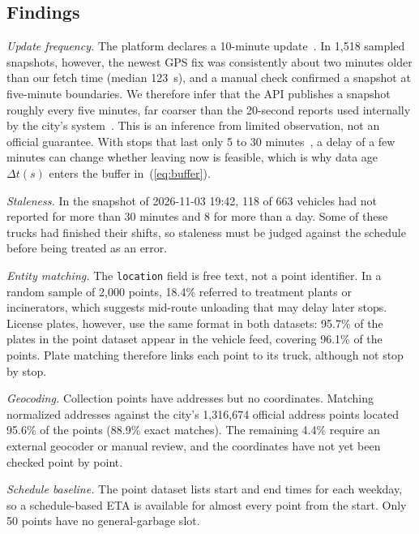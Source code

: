 \subsection{Findings}
\emph{Update frequency.} The platform declares a 10-minute
update~\cite{dataset83558}. In 1{,}518 sampled snapshots, however, the
newest GPS fix was consistently about two minutes older than our fetch
time (median 123~s), and a manual check confirmed a snapshot at
five-minute boundaries. We therefore infer that the API publishes a
snapshot roughly every five minutes, far coarser than the 20-second
reports used internally by the city's system~\cite{tcepb2022report}. This
is an inference from limited observation, not an official guarantee.
With stops that last only 5 to 30 minutes~\cite{tcepb2026spring}, a delay
of a few minutes can change whether leaving now is feasible, which is why
data age $\Delta t(s)$ enters the buffer in~(\ref{eq:buffer}).

\emph{Staleness.} In the snapshot of 2026-11-03 19:42, 118 of 663
vehicles had not reported for more than 30 minutes and 8 for more than a
day. Some of these trucks had finished their shifts, so staleness must be
judged against the schedule before being treated as an error.

\emph{Entity matching.} The \texttt{location} field is free text, not a
point identifier. In a random sample of 2{,}000 points, 18.4\% referred to
treatment plants or incinerators, which suggests mid-route unloading that
may delay later stops. License plates, however, use the same format in
both datasets: 95.7\% of the plates in the point dataset appear in the
vehicle feed, covering 96.1\% of the points. Plate matching therefore
links each point to its truck, although not stop by stop.

\emph{Geocoding.} Collection points have addresses but no coordinates.
Matching normalized addresses against the city's 1{,}316{,}674 official
address points located 95.6\% of the points (88.9\% exact matches). The
remaining 4.4\% require an external geocoder or manual review, and the
coordinates have not yet been checked point by point.

\emph{Schedule baseline.} The point dataset lists start and end times for
each weekday, so a schedule-based ETA is available for almost every point
from the start. Only 50 points have no general-garbage slot.

